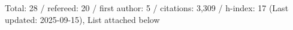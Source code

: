 Total: 28 / refereed: 20 / first author: 5 / citations: 3,309 / h-index: 17 (Last updated: 2025-09-15), List attached below